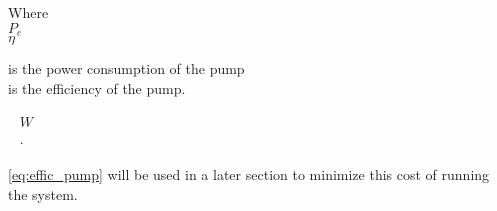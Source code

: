\begin{minipage}[t]{0.20\textwidth}
Where\\
\hspace*{8mm} $P_e$\\
\hspace*{8mm} $\eta$
\end{minipage}
\begin{minipage}[t]{0.68\textwidth}
\vspace*{2mm}
is the power consumption of the pump\\
is the efficiency of the pump.
\end{minipage}
\begin{minipage}[t]{0.10\textwidth}
\vspace*{2mm}
\textcolor{White}{te}$\unit{W}$\\
\textcolor{White}{te}$\unit{\cdot}$\\
\end{minipage}	

\eqref{eq:effic_pump} will be used in a later section to minimize this cost of running the system. 






